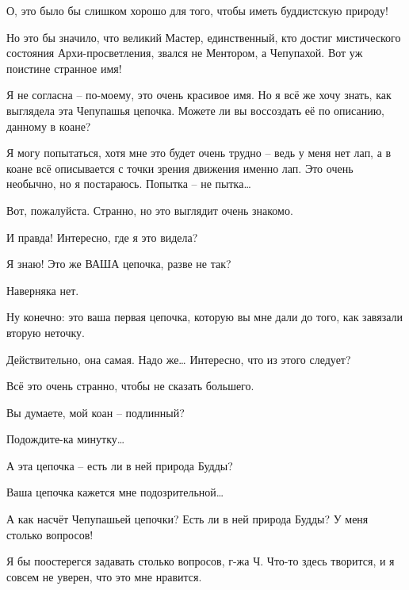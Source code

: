 \documentclass[../main.tex]{subfiles}
\begin{document}
\begin{dialogue}
 О, это было бы слишком хорошо для того, чтобы иметь буддистскую природу!

 Но это бы значило, что великий Мастер, единственный, кто достиг мистического состояния Архи-просветления, звался не Ментором, а Чепупахой. Вот уж поистине странное имя!

 Я не согласна \--- по-моему, это очень красивое имя. Но я всё же хочу знать, как выглядела эта Чепупашья цепочка. Можете ли вы воссоздать её по описанию, данному в коане?

 Я могу попытаться, хотя мне это будет очень трудно \--- ведь у меня нет лап, а в коане всё описывается с точки зрения движения именно лап. Это очень необычно, но я постараюсь. Попытка \--- не пытка\ldots{}


Вот, пожалуйста. Странно, но это выглядит очень знакомо.

 И правда! Интересно, где я это видела?

 Я знаю! Это же ВАША цепочка, разве не так?

 Наверняка нет.

 Ну конечно: это ваша первая цепочка, которую вы мне дали до того, как завязали вторую неточку.

 Действительно, она самая. Надо же\ldots{} Интересно, что из этого следует?

 Всё это очень странно, чтобы не сказать большего.

 Вы думаете, мой коан \--- подлинный?

 Подождите-ка минутку\ldots{}

 А эта цепочка \--- есть ли в ней природа Будды?

 Ваша цепочка кажется мне подозрительной\ldots{}

 А как насчёт Чепупашьей цепочки? Есть ли в ней природа Будды? У меня столько вопросов!

 Я бы поостерегся задавать столько вопросов, г-жа Ч\@. Что-то здесь творится, и я совсем не уверен, что это мне нравится.


\end{dialogue}
\end{document}
